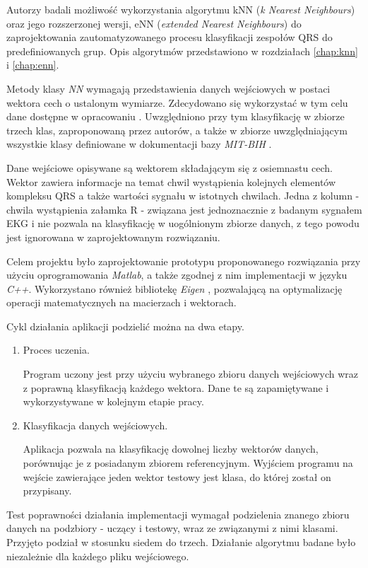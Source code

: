 Autorzy badali możliwość wykorzystania algorytmu kNN (\textit{k Nearest Neighbours}) oraz jego rozszerzonej wersji, eNN (\textit{extended Nearest Neighbours}) do zaprojektowania zautomatyzowanego procesu klasyfikacji zespołów QRS do predefiniowanych grup. Opis algorytmów przedstawiono w rozdziałach \ref{chap:knn} i \ref{chap:enn}.

Metody klasy \textit{NN} wymagają przedstawienia danych wejściowych w postaci wektora cech o ustalonym wymiarze. Zdecydowano się wykorzystać w tym celu dane dostępne w opracowaniu \cite{heart-class-module}. Uwzględniono przy tym klasyfikację w zbiorze trzech klas, zaproponowaną przez autorów, a także w zbiorze uwzględniającym wszystkie klasy definiowane w dokumentacji bazy \textit{MIT-BIH} \cite{mitdb}.

Dane wejściowe opisywane są wektorem składającym się z osiemnastu cech. Wektor zawiera informacje na temat chwil wystąpienia kolejnych elementów kompleksu QRS a także wartości sygnału w istotnych chwilach. Jedna z kolumn - chwila wystąpienia załamka R - związana jest jednoznacznie z badanym sygnałem EKG i nie pozwala na klasyfikację w uogólnionym zbiorze danych, z tego powodu jest ignorowana w zaprojektowanym rozwiązaniu.

Celem projektu było zaprojektowanie prototypu proponowanego rozwiązania przy użyciu oprogramowania \textit{Matlab}, a także zgodnej z nim implementacji w języku \textit{C++}. Wykorzystano również bibliotekę \textit{Eigen} \cite{eigen-www}, pozwalającą na optymalizację operacji matematycznych na macierzach i wektorach.

Cykl działania aplikacji podzielić można na dwa etapy.
\begin{enumerate}
	\item Proces uczenia.
	
	Program uczony jest przy użyciu wybranego zbioru danych wejściowych wraz z poprawną klasyfikacją każdego wektora. Dane te są zapamiętywane i wykorzystywane w kolejnym etapie pracy.
	
	\item
	Klasyfikacja danych wejściowych.
	
	Aplikacja pozwala na klasyfikację dowolnej liczby wektorów danych, porównując je z posiadanym zbiorem referencyjnym. Wyjściem programu na wejście zawierające jeden wektor testowy jest klasa, do której został on przypisany.
\end{enumerate}

Test poprawności działania implementacji wymagał podzielenia znanego zbioru danych na podzbiory - uczący i testowy, wraz ze związanymi z nimi klasami. Przyjęto podział w stosunku siedem do trzech. Działanie algorytmu badane było niezależnie dla każdego pliku wejściowego.

